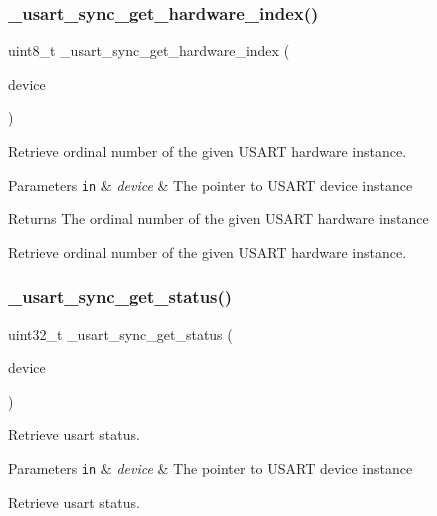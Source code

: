 \subsubsection{\texorpdfstring{\+\_\+usart\+\_\+sync\+\_\+get\+\_\+hardware\+\_\+index()}{\_usart\_sync\_get\_hardware\_index()}}
{\footnotesize\ttfamily uint8\+\_\+t \+\_\+usart\+\_\+sync\+\_\+get\+\_\+hardware\+\_\+index (\begin{DoxyParamCaption}\item[{const struct \hyperlink{struct__usart__sync__device}{\+\_\+usart\+\_\+sync\+\_\+device} $\ast$const}]{device }\end{DoxyParamCaption})}



Retrieve ordinal number of the given U\+S\+A\+RT hardware instance. 


\begin{DoxyParams}[1]{Parameters}
\mbox{\tt in}  & {\em device} & The pointer to U\+S\+A\+RT device instance\\
\hline
\end{DoxyParams}
\begin{DoxyReturn}{Returns}
The ordinal number of the given U\+S\+A\+RT hardware instance
\end{DoxyReturn}
Retrieve ordinal number of the given U\+S\+A\+RT hardware instance. \mbox{\label{group___h_p_l_ga512c769b924d59433542bf347980334b}} 
\subsubsection{\texorpdfstring{\+\_\+usart\+\_\+sync\+\_\+get\+\_\+status()}{\_usart\_sync\_get\_status()}}
{\footnotesize\ttfamily uint32\+\_\+t \+\_\+usart\+\_\+sync\+\_\+get\+\_\+status (\begin{DoxyParamCaption}\item[{const struct \hyperlink{struct__usart__sync__device}{\+\_\+usart\+\_\+sync\+\_\+device} $\ast$const}]{device }\end{DoxyParamCaption})}



Retrieve usart status. 


\begin{DoxyParams}[1]{Parameters}
\mbox{\tt in}  & {\em device} & The pointer to U\+S\+A\+RT device instance\\
\hline
\end{DoxyParams}
Retrieve usart status. \mbox{\label{group___h_p_l_gad1cc7b8e72fd67fdeec8062c802eb25a}} 
